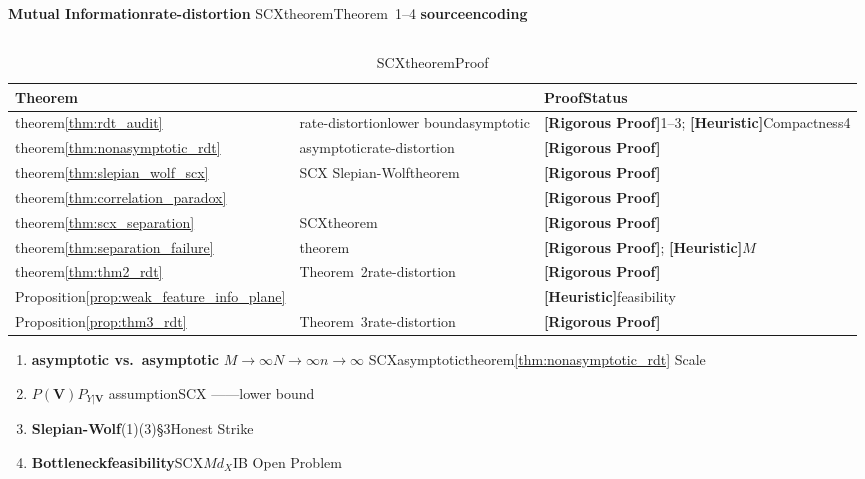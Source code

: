 \documentclass[11pt,a4paper]{article}
\theoremstyle{remark}
\newcommand{\rigorous}{\textnormal{\textbf{[Rigorous Proof]}}}
\newcommand{\heuristic}{\textnormal{\textbf{[Heuristic]}}}
\begin{document}
\textbf{Mutual Information}\textbf{rate-distortion}
SCXtheoremTheorem~1--4
\textbf{source}\textbf{encoding}\textbf{}

\subsection{}

\begin{table}[htbp]
\centering
\caption{SCXtheoremProof}
\label{tab:honesty_info}
\begin{tabular}{@{}lll@{}}
\toprule
\textbf{Theorem} & \textbf{} & \textbf{ProofStatus} \\
\midrule
theorem\ref{thm:rdt_audit} & rate-distortionlower boundasymptotic & \rigorous 1--3; \heuristic Compactness4\\
theorem\ref{thm:nonasymptotic_rdt} & asymptoticrate-distortion & \rigorous  \\
theorem\ref{thm:slepian_wolf_scx} & SCX Slepian-Wolftheorem & \rigorous \\
theorem\ref{thm:correlation_paradox} &  & \rigorous  \\
theorem\ref{thm:scx_separation} & SCXtheorem & \rigorous  \\
theorem\ref{thm:separation_failure} & theorem & \rigorous ; \heuristic $M$\\
theorem\ref{thm:thm2_rdt} & Theorem~2rate-distortion & \rigorous  \\
Proposition\ref{prop:weak_feature_info_plane} &  & \heuristic feasibility\\
Proposition\ref{prop:thm3_rdt} & Theorem~3rate-distortion & \rigorous  \\
\bottomrule
\end{tabular}
\end{table}

\textbf{}
\begin{enumerate}[label=(\arabic*)]
    \item \textbf{asymptotic vs.\ }\textbf{asymptotic}
          $M \to \infty$$N \to \infty$$n \to \infty$
          SCXasymptotictheorem\ref{thm:nonasymptotic_rdt}
          Scale
    \item \textbf{}$P(\mathbf{V})$$P_{Y|\mathbf{V}}$
          assumptionSCX
          ——lower bound
    \item \textbf{Slepian-Wolf}(1)(3)\S3Honest Strike
    \item \textbf{Bottleneckfeasibility}SCX$M$$d_X$IB
          Open Problem
\end{enumerate}
\end{document}
